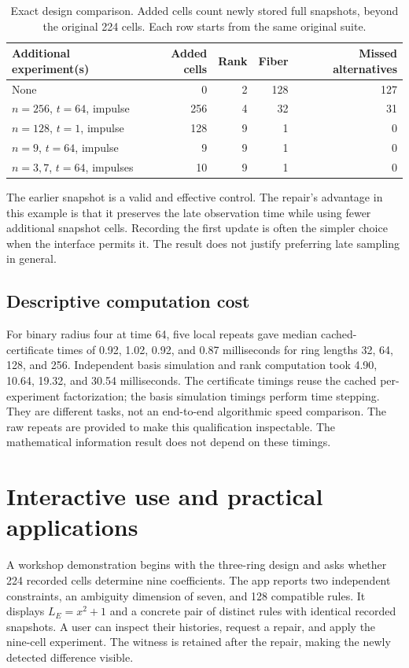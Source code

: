 \documentclass[11pt]{article}
\begin{document}
\begin{table}[t]
\centering\small
\caption{Exact design comparison. Added cells count newly stored full snapshots, beyond the original 224 cells. Each row starts from the same original suite.}
\label{tab:repair}
\begin{tabular}{@{}p{.37\linewidth}rrrr@{}}
\toprule
Additional experiment(s) & Added cells & Rank & Fiber & Missed alternatives\\\midrule
None & 0 & 2 & 128 & 127\\
$n=256$, $t=64$, impulse & 256 & 4 & 32 & 31\\
$n=128$, $t=1$, impulse & 128 & 9 & 1 & 0\\
$n=9$, $t=64$, impulse & 9 & 9 & 1 & 0\\
$n=3,7$, $t=64$, impulses & 10 & 9 & 1 & 0\\\bottomrule
\end{tabular}
\end{table}
The earlier snapshot is a valid and effective control. The repair's advantage in this example is that it preserves the late observation time while using fewer additional snapshot cells. Recording the first update is often the simpler choice when the interface permits it. The result does not justify preferring late sampling in general.

\subsection{Descriptive computation cost}
For binary radius four at time 64, five local repeats gave median cached-certificate times of 0.92, 1.02, 0.92, and 0.87 milliseconds for ring lengths 32, 64, 128, and 256. Independent basis simulation and rank computation took 4.90, 10.64, 19.32, and 30.54 milliseconds. The certificate timings reuse the cached per-experiment factorization; the basis simulation timings perform time stepping. They are different tasks, not an end-to-end algorithmic speed comparison. The raw repeats are provided to make this qualification inspectable. The mathematical information result does not depend on these timings.

\section{Interactive use and practical applications}
A workshop demonstration begins with the three-ring design and asks whether 224 recorded cells determine nine coefficients. The app reports two independent constraints, an ambiguity dimension of seven, and 128 compatible rules. It displays $L_E=x^2+1$ and a concrete pair of distinct rules with identical recorded snapshots. A user can inspect their histories, request a repair, and apply the nine-cell experiment. The witness is retained after the repair, making the newly detected difference visible.
\end{document}
